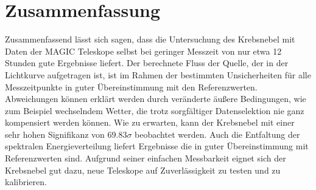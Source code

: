 \section{Zusammenfassung}
\label{sec:zusammenfassung}

Zusammenfassend lässt sich sagen, dass die Untersuchung des Krebsnebel mit Daten
der MAGIC Teleskope selbst bei geringer Messzeit von nur etwa 12 Stunden gute
Ergebnisse liefert. Der berechnete Fluss der Quelle, der in der Lichtkurve
aufgetragen ist, ist im Rahmen der bestimmten Unsicherheiten für alle
Messzeitpunkte in guter Übereinstimmung mit den Referenzwerten. Abweichungen
können erklärt werden durch veränderte äußere Bedingungen, wie zum Beispiel
wechselndem Wetter, die trotz sorgfältiger Datenselektion nie ganz kompensiert
werden können. Wie zu erwarten, kann der Krebsnebel mit einer sehr hohen
Signifikanz von $\num{69.83}\sigma$ beobachtet werden. Auch die Entfaltung der
spektralen Energieverteilung liefert Ergebnisse die in guter Übereinstimmung mit
Referenzwerten sind. Aufgrund seiner einfachen Messbarkeit eignet sich der
Krebsnebel gut dazu, neue Teleskope auf Zuverlässigkeit zu testen und zu
kalibrieren.
